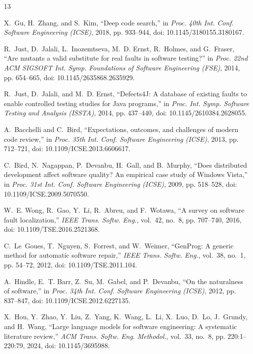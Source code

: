 \documentclass[10pt,conference]{IEEEtran}
\begin{document}
\begin{thebibliography}{13}

X.~Gu, H.~Zhang, and S.~Kim, ``Deep code search,'' in \emph{Proc. 40th Int. Conf. Software Engineering
(ICSE)}, 2018, pp. 933--944, doi: 10.1145/3180155.3180167.

R.~Just, D.~Jalali, L.~Inozemtseva, M.~D. Ernst, R.~Holmes, and G.~Fraser, ``Are mutants a valid substitute
for real faults in software testing?'' in \emph{Proc. 22nd ACM SIGSOFT Int. Symp. Foundations of Software
Engineering (FSE)}, 2014, pp. 654--665, doi: 10.1145/2635868.2635929.

R.~Just, D.~Jalali, and M.~D. Ernst, ``Defects4J: A database of existing faults to enable controlled testing
studies for Java programs,'' in \emph{Proc. Int. Symp. Software Testing and Analysis (ISSTA)}, 2014,
pp. 437--440, doi: 10.1145/2610384.2628055.

A.~Bacchelli and C.~Bird, ``Expectations, outcomes, and challenges of modern code review,'' in \emph{Proc.
35th Int. Conf. Software Engineering (ICSE)}, 2013, pp. 712--721, doi: 10.1109/ICSE.2013.6606617.

C.~Bird, N.~Nagappan, P.~Devanbu, H.~Gall, and B.~Murphy, ``Does distributed development affect software
quality? An empirical case study of Windows Vista,'' in \emph{Proc. 31st Int. Conf. Software Engineering
(ICSE)}, 2009, pp. 518--528, doi: 10.1109/ICSE.2009.5070550.

W.~E. Wong, R.~Gao, Y.~Li, R.~Abreu, and F.~Wotawa, ``A survey on software fault localization,'' \emph{IEEE
Trans. Softw. Eng.}, vol.~42, no.~8, pp. 707--740, 2016, doi: 10.1109/TSE.2016.2521368.

C.~Le~Goues, T.~Nguyen, S.~Forrest, and W.~Weimer, ``GenProg: A generic method for automatic software
repair,'' \emph{IEEE Trans. Softw. Eng.}, vol.~38, no.~1, pp. 54--72, 2012, doi: 10.1109/TSE.2011.104.

A.~Hindle, E.~T. Barr, Z.~Su, M.~Gabel, and P.~Devanbu, ``On the naturalness of software,'' in \emph{Proc.
34th Int. Conf. Software Engineering (ICSE)}, 2012, pp. 837--847, doi: 10.1109/ICSE.2012.6227135.

X.~Hou, Y.~Zhao, Y.~Liu, Z.~Yang, K.~Wang, L.~Li, X.~Luo, D.~Lo, J.~Grundy, and H.~Wang, ``Large language
models for software engineering: A systematic literature review,'' \emph{ACM Trans. Softw. Eng. Methodol.},
vol.~33, no.~8, pp. 220:1--220:79, 2024, doi: 10.1145/3695988.


\end{thebibliography}
\end{document}
